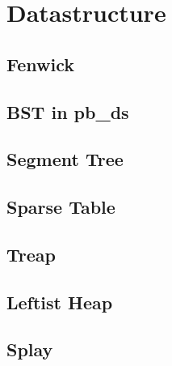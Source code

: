 \section{Datastructure}
\subsection{Fenwick}



\subsection{BST in pb\_ds}


\subsection{Segment Tree}



\subsection{Sparse Table}


\subsection{Treap}


\subsection{Leftist Heap}


\subsection{Splay}


